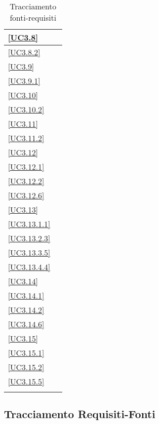 \begin{longtable}{|P{6cm}|P{6cm}|}
	\hline \ref{UC3.8} &  \\
	\hline \ref{UC3.8.2} &  \\
	\hline \ref{UC3.9} &  \\
	\hline \ref{UC3.9.1} &  \\
	\hline \ref{UC3.10} &  \\
	\hline \ref{UC3.10.2} &  \\
	\hline \ref{UC3.11} &  \\
	\hline \ref{UC3.11.2} &  \\
	\hline \ref{UC3.12} &  \\
	\hline \ref{UC3.12.1} &  \\
	\hline \ref{UC3.12.2} &  \\
	\hline \ref{UC3.12.6} &  \\
	\hline \ref{UC3.13} &  \\
	\hline \ref{UC3.13.1.1} &  \\
	\hline \ref{UC3.13.2.3} &  \\
	\hline \ref{UC3.13.3.5} &  \\
	\hline \ref{UC3.13.4.4} &  \\
	\hline \ref{UC3.14} &  \\
	\hline \ref{UC3.14.1} &  \\
	\hline \ref{UC3.14.2} &  \\
	\hline \ref{UC3.14.6} &  \\
	\hline \ref{UC3.15} &  \\
	\hline \ref{UC3.15.1} &  \\
	\hline \ref{UC3.15.2} &  \\
	\hline \ref{UC3.15.5} &  \\
	\hline
	\caption{Tracciamento fonti-requisiti}
\end{longtable}

\subsection{Tracciamento Requisiti-Fonti}


